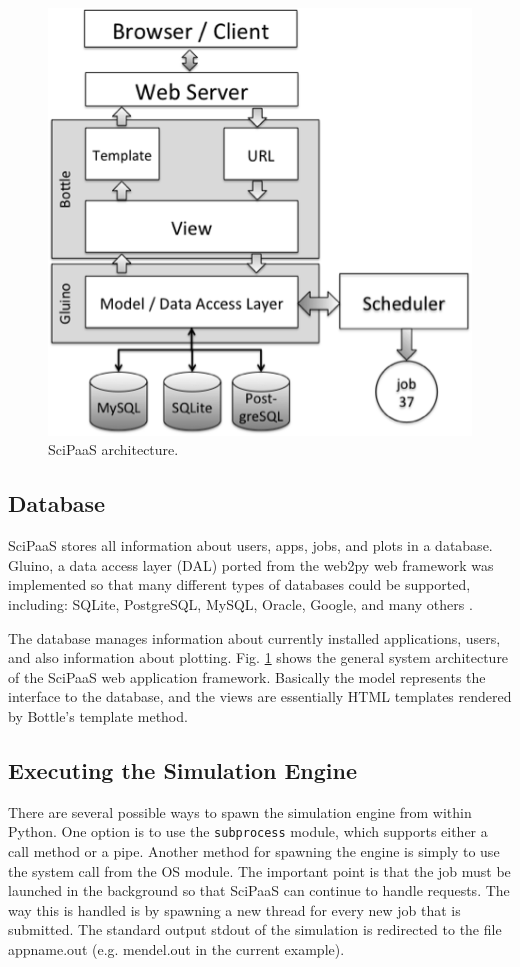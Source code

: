 \documentclass[10pt,reprint]{socc14}
\begin{document}
\begin{figure}[t]
\centering
\includegraphics[natwidth=450,natheight=454]{figs/arch.png}
\caption{SciPaaS architecture. \label{arch}}
\end{figure}

\subsection{Database}

SciPaaS stores all information about users, apps, jobs, and plots in a database. Gluino, a data access layer (DAL) ported from the web2py web framework was implemented so that many different types of databases could be supported, including: SQLite, PostgreSQL, MySQL, Oracle, Google, and many others \cite{web2py}.

The database manages information about currently installed applications, users, and also information about plotting.  Fig. \ref{arch} shows the general system architecture of the SciPaaS web application framework. Basically the model represents the interface to the database, and the views are essentially HTML templates rendered by Bottle’s template method.

\subsection{Executing the Simulation Engine}

There are several possible ways to spawn the simulation engine from within Python.  One option is to use the \texttt{subprocess} module, which supports either a call method or a pipe.  Another method for spawning the engine is simply to use the system call from the OS module.  The important point is that the job must be launched in the background so that SciPaaS can continue to handle requests.  The way this is handled is by spawning a new thread for every new job that is submitted. The standard output stdout of the simulation is redirected to the file appname.out (e.g. mendel.out in the current example).
\end{document}
